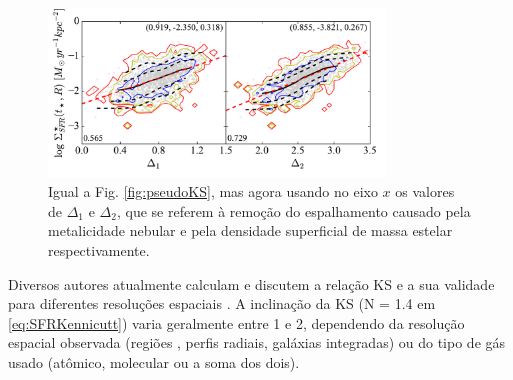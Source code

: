 \begin{figure}
	\centering
	\includegraphics[width=0.8\textwidth]{figuras/pseudoKS_noscat.pdf}
	\caption[A {\em pseudo-KS} sem os principais causadores de espalhamento.]
	{Igual a Fig. \ref{fig:pseudoKS}, mas agora usando no eixo $x$ os valores de $\Delta_1$ e
$\Delta_2$, que se referem à remoção do espalhamento causado pela metalicidade nebular e pela
densidade superficial de massa estelar respectivamente.}
	\label{fig:pseudoKS_noscat}
\end{figure}


Diversos autores atualmente calculam e discutem a relação KS e a sua validade para diferentes
resoluções espaciais \citep[e.g., ][]{Kennicutt.etal.2007a, Leroy.etal.2012a,
Calzetti.Liu.Koda.2012a, Lada.etal.2013a, Tacconi.etal.2013a, Casasola.etal.2015a}. A inclinação
da KS (N = 1.4 em \eqref{eq:SFRKennicutt}) varia geralmente entre 1 e 2, dependendo da resolução
espacial observada (regiões \Hii, perfis radiais, galáxias integradas) ou do tipo de gás usado
(atômico, molecular ou a soma dos dois).

